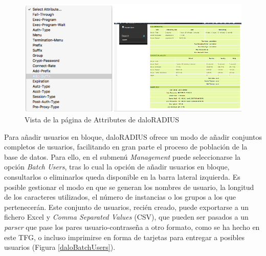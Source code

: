 \begin{figure}[!t]
\begin{center}
\includegraphics[width=0.75\linewidth]{./5_AnalisisOrganico/Img/daloAttributes.png}
\end{center}
\caption{Vista de la página de Attributes de daloRADIUS}
\label{daloAttributes}
\end{figure}

Para añadir usuarios en bloque, daloRADIUS ofrece un modo de añadir conjuntos completos de usuarios, facilitando en gran parte el proceso de población de la base de datos. Para ello, en el submenú \emph{Management} puede seleccionarse la opción \emph{Batch Users}, tras lo cual la opción de añadir usuarios en bloque, consultarlos o eliminarlos queda disponible en la barra lateral izquierda. Es posible gestionar el modo en que se generan los nombres de usuario, la longitud de los caracteres utilizados, el número de instancias o los grupos a los que pertenecerán. Este conjunto de usuarios, recién creado, puede exportarse a un fichero Excel y \emph{Comma Separated Values} (\acrshort{CSV}), que pueden ser pasados a un \emph{parser} que pase los pares usuario-contraseña a otro formato, como se ha hecho en este TFG, o incluso imprimirse en forma de tarjetas para entregar a posibles usuarios (Figura \ref{daloBatchUsers}).

